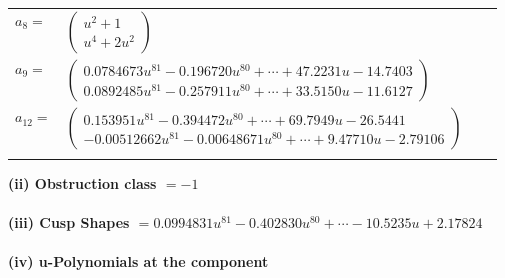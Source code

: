 \documentclass[1p]{elsarticle_modified}
\theoremstyle{definition}
\begin{document}
\begin{tabular}{m{7pt} m{180pt} m{7pt} m{180pt} }
\flushright $a_{8}=$&$\begin{pmatrix}u^2+1\\u^4+2 u^2\end{pmatrix}$ \\
\flushright $a_{9}=$&$\begin{pmatrix}0.0784673 u^{81}-0.196720 u^{80}+\cdots+47.2231 u-14.7403\\0.0892485 u^{81}-0.257911 u^{80}+\cdots+33.5150 u-11.6127\end{pmatrix}$ \\
\flushright $a_{12}=$&$\begin{pmatrix}0.153951 u^{81}-0.394472 u^{80}+\cdots+69.7949 u-26.5441\\-0.00512662 u^{81}-0.00648671 u^{80}+\cdots+9.47710 u-2.79106\end{pmatrix}$\\&\end{tabular}
\flushleft \textbf{(ii) Obstruction class $= -1$}\\~\\
\flushleft \textbf{(iii) Cusp Shapes $= 0.0994831 u^{81}-0.402830 u^{80}+\cdots-10.5235 u+2.17824$}\\~\\
\newpage\renewcommand{\arraystretch}{1}
\flushleft \textbf{(iv) u-Polynomials at the component}\newline \\
\end{document}
